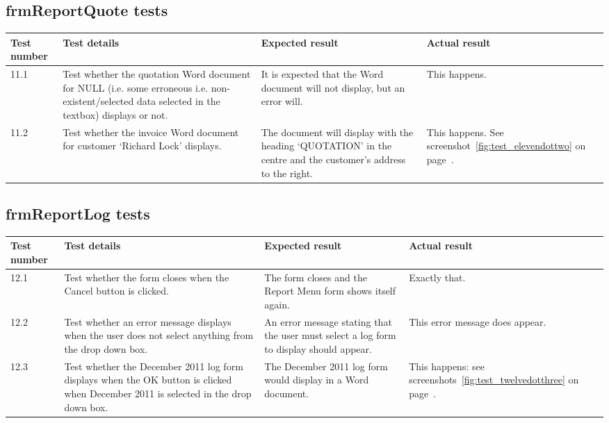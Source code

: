 \subsection{frmReportQuote tests}

\begin{longtable}{ | p{2cm} | p{4cm} | p{4cm} | p{4cm} | }
	\hline
	\textbf{Test number} & \textbf{Test details} & \textbf{Expected result} & \textbf{Actual result}\\
	\endfirsthead
	\hline
	11.1 & Test whether the quotation Word document for NULL (i.e. some erroneous i.e. non-existent\slash selected data selected in the textbox) displays or not. & It is expected that the Word document will not display, but an error will. & This happens.\\
	\hline
	11.2 & Test whether the invoice Word document for customer `Richard Lock' displays. & The document will display with the heading `QUOTATION' in the centre and the customer's address to the right. & This happens.  See screenshot~\ref{fig:test_elevendottwo} on page~\pageref{fig:test_elevendottwo}.\\
	\hline
\end{longtable}

\subsection{frmReportLog tests}

\begin{longtable}{ | p{2cm} | p{4cm} | p{4cm} | p{4cm} | }
	\hline
	\textbf{Test number} & \textbf{Test details} & \textbf{Expected result} & \textbf{Actual result}\\
	\endfirsthead
	\hline
	12.1 & Test whether the form closes when the Cancel button is clicked. & The form closes and the Report Menu form shows itself again. & Exactly that.\\
	\hline
	12.2 & Test whether an error message displays when the user does not select anything from the drop down box. & An error message stating that the user must select a log form to display should appear. & This error message does appear.\\
	\hline
	12.3 & Test whether the December 2011 log form displays when the OK button is clicked when December 2011 is selected in the drop down box. & The December 2011 log form would display in a Word document. & This happens: see screenshots~\ref{fig:test_twelvedotthree} on page~\pageref{fig:test_twelvedotthree}.\\
	\hline
\end{longtable}
